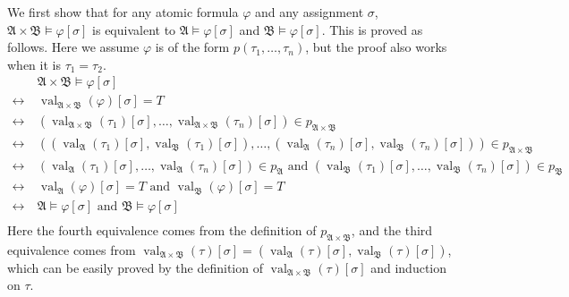 \documentclass[12pt]{article}
\newcommand{\val}{\mathop{\mathrm{val}}}
\theoremstyle{definition}
\newenvironment{customthm}[1]
  {\renewcommand\theinnercustomthm{#1}\innercustomthm}
  {\endinnercustomthm}
\begin{document}
\begin{customthm}{II.14.3} We first show that for any atomic formula $\varphi$ and any assignment $\sigma$, $\mathfrak{A}\times\mathfrak{B}\models\varphi[\sigma]$ is equivalent to $\mathfrak{A}\models\varphi[\sigma]$ and $\mathfrak{B}\models\varphi[\sigma]$. This is proved as follows. Here we assume $\varphi$ is of the form $p(\tau_1,\ldots,\tau_n)$, but the proof also works when it is $\tau_1=\tau_2$.
\begin{align*}
  &\mathfrak{A}\times\mathfrak{B}\models\varphi[\sigma] \\
  \leftrightarrow~&\textstyle\val_{\mathfrak{A}\times\mathfrak{B}}(\varphi)[\sigma]=T \\
  \leftrightarrow~&\textstyle(\val_{\mathfrak{A}\times\mathfrak{B}}(\tau_1)[\sigma],\ldots,\val_{\mathfrak{A}\times\mathfrak{B}}(\tau_n)[\sigma])\in p_{\mathfrak{A}\times\mathfrak{B}} \\
  \leftrightarrow~&\textstyle((\val_\mathfrak{A}(\tau_1)[\sigma],\val_\mathfrak{B}(\tau_1)[\sigma]),\ldots,(\val_\mathfrak{A}(\tau_n)[\sigma],\val_\mathfrak{B}(\tau_n)[\sigma]))\in p_{\mathfrak{A}\times\mathfrak{B}} \\
  \leftrightarrow~&\textstyle(\val_\mathfrak{A}(\tau_1)[\sigma],\ldots,\val_\mathfrak{A}(\tau_n)[\sigma])\in p_\mathfrak{A}\mbox{ and }(\val_\mathfrak{B}(\tau_1)[\sigma],\ldots,\val_\mathfrak{B}(\tau_n)[\sigma])\in p_\mathfrak{B} \\
  \leftrightarrow~&\textstyle\val_\mathfrak{A}(\varphi)[\sigma]=T\mbox{ and }\val_\mathfrak{B}(\varphi)[\sigma]=T \\
  \leftrightarrow~&\mathfrak{A}\models\varphi[\sigma]\mbox{ and }\mathfrak{B}\models\varphi[\sigma] \\
\end{align*}
Here the fourth equivalence comes from the definition of $p_{\mathfrak{A}\times\mathfrak{B}}$, and the third equivalence comes from $\val_{\mathfrak{A}\times\mathfrak{B}}(\tau)[\sigma]=(\val_\mathfrak{A}(\tau)[\sigma],\val_\mathfrak{B}(\tau)[\sigma])$, which can be easily proved by the definition of $\val_{\mathfrak{A}\times\mathfrak{B}}(\tau)[\sigma]$ and induction on $\tau$.


\end{customthm}
\end{document}
